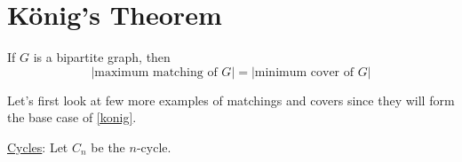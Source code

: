 \section{König's Theorem}
\begin{thmbox}
    \begin{theorem}
        If $ G $ is a bipartite graph, then
        \[ |\text{maximum matching of }G|=|\text{minimum cover of }G| \]
    \end{theorem}
\end{thmbox}
Let's first look at few more examples of matchings and covers since they will form the
base case of \ref{konig}.

\underline{Cycles}: Let $ C_n $ be the $ n $-cycle.



